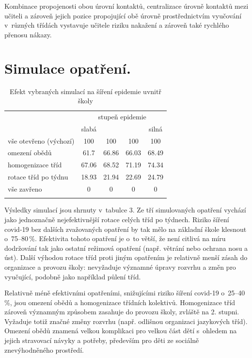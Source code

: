 Kombinace propojenosti obou úrovní kontaktů, centralizace úrovně kontaktů mezi učiteli a zároveň jejich pozice propojující obě úrovně prostřednictvím vyučování v~různých třídách vystavuje učitele riziku nakažení a zároveň také rychlého přenosu nákazy. 

    
\section*{Simulace opatření.} 

\begin{table}
    \centering
    \caption{Efekt vybraných simulací na šíření epidemie uvnitř školy}
\begin{tabular}{lcccc}
\hline
                       & \multicolumn{4}{c}{stupeň epidemie} \\ 
                       & slabá   &         &        & silná  \\ \hline
vše otevřeno (výchozí) & 100     & 100     & 100    & 100    \\
omezení obědů          & 61.7    & 66.86   & 66.03  & 68.49  \\
homogenizace tříd      & 67.06   & 68.52   & 71.19  & 74.34  \\
rotace tříd po týdnu   & 18.93   & 21.94   & 22.69  & 24.79  \\
vše zavřeno            & 0       & 0       & 0      & 0      \\ \hline
\label{tab:100-sims}
\end{tabular}
\end{table}

Výsledky simulací jsou shrnuty v~tabulce 3. Ze tří simulovaných opatření vychází jako jednoznačně nejefektivnější rotace celých tříd po týdnech. Riziko šíření covid-19 bez dalších zvažovaných opatření by tak mělo na základní škole klesnout o~75--80\,\%. Efektivita tohoto opatření je o~to větší, že není citlivá na míru dodržování tak jako ostatní režimová opatření (např. větrání nebo ochrana nosu a úst). Další výhodou rotace tříd proti jiným opatřením je relativně menší zásah do organizace a provozu školy: nevyžaduje významné úpravy rozvrhu a změn pro vyučující, podobně jako například půlení tříd.

Relativně méně efektivními opatřeními, snižujícími riziko šíření covid-19 o~25--40\,\%, jsou omezení obědů a homogenizace třídních kolektivů. Homogenizace tříd zároveň významným způsobem zasahuje do provozu školy, zvláště na 2. stupni. Vyžaduje totiž značné změny rozvrhu (např. odlišnou organizaci jazykových tříd). Omezení obědů znamená velkou komplikaci pro velkou část dětí s~ohledem na jejich stravovací návyky a potřeby, především pro děti ze sociálně znevýhodněného prostředí.


